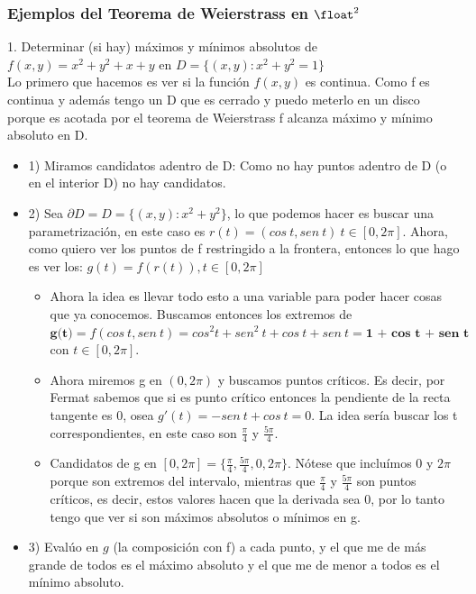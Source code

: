 \documentclass[10pt,a4paper]{article}
\begin{document}
\subsubsection*{Ejemplos del Teorema de Weierstrass en $\float^{2}$}
1. Determinar (si hay) máximos y mínimos absolutos de $f(x,y) = x^{2} + y^{2} + x + y$ en $D = \{(x,y): x^{2} + y^{2} = 1\}$ \\
Lo primero que hacemos es ver si la función $f(x,y)$ es continua. Como f es continua y además tengo un D que es cerrado y puedo meterlo en un disco porque es acotada por el teorema de Weierstrass f alcanza máximo y mínimo absoluto en D.
\begin{itemize}
    \item 1) Miramos candidatos adentro de D: Como no hay puntos adentro de D (o en el interior D) no hay candidatos.
    \item 2) Sea $\partial D = D = \{(x,y):x^{2} + y^{2}\}$, lo que podemos hacer es buscar una parametrización, en este caso es $r(t) = (cos \ t, sen \ t) \ t \in [0, 2\pi]$. Ahora, como quiero ver los puntos de f restringido a la frontera, entonces lo que hago es ver los: $g(t) = f(r(t)), t \in [0, 2\pi]$
    \begin{itemize}
        \item Ahora la idea es llevar todo esto a una variable para poder hacer cosas que ya conocemos. Buscamos entonces los extremos de $\textbf{g(t)} = f(cos \ t, sen \ t) = cos^{2}t + sen^{2} \ t + cos \ t + sen \ t = \textbf{1 + cos \ t + sen \ t}$ con $t \in [0, 2\pi]$.
        \item Ahora miremos g en $(0, 2\pi)$ y buscamos puntos críticos. Es decir, por Fermat sabemos que si es punto crítico entonces la pendiente de la recta tangente es 0, osea $g'(t) = -sen \ t + cos \ t = 0$. La idea sería buscar los t correspondientes, en este caso son $\frac{\pi}{4}$ y $\frac{5\pi}{4}$.
        \item Candidatos de g en $[0, 2\pi] = \{\frac{\pi}{4}, \frac{5\pi}{4}, 0, 2 \pi \}$. Nótese que incluímos 0 y $2\pi$ porque son extremos del intervalo, mientras que $\frac{\pi}{4}$ y $\frac{5\pi}{4}$ son puntos críticos, es decir, estos valores hacen que la derivada sea 0, por lo tanto tengo que ver si son máximos absolutos o mínimos en g. 
    \end{itemize}
    \item 3) Evalúo en $g$ (la composición con f) a cada punto, y el que me de más grande de todos es el máximo absoluto y el que me de menor a todos es el mínimo absoluto.
    \begin{itemize}

\end{itemize}
\end{itemize}
\end{document}
